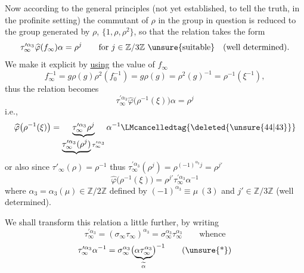 

Now according to the general principles (not yet established, to tell the truth, in the profinite setting) the commutant of $\rho$ in the group in question is reduced to the group generated by $\rho$, $\{1,\rho,\rho^2\}$, so that the relation \unsure{(*)} takes the form
\[
\tau_\infty^{\prime\alpha_3}\widehat{\varphi}(f_\infty)\alpha=\rho^j
\qquad\text{for }j\in\mathbb Z/3\mathbb Z\ \unsure{\text{suitable}}
\quad\text{(well determined)}.
\]
We make it explicit by \uline{using} the value of $f_\infty$
\[
f_\infty^{-1}=g\rho(g)\rho^2(f_0^{-1})
=g\rho(g)=\rho^2(g)^{-1}=\rho^{-1}(\xi^{-1}),
\]
thus the relation  becomes
\[
\tau_\infty^{\prime\alpha_3}\widehat{\varphi}\bigl(\rho^{-1}(\xi)\bigr)\alpha=\rho^j
\]
i.e., 
\[
\widehat{\varphi}\bigl(\rho^{-1}(\xi)\bigr)
=\underbrace{\tau_\infty^{\prime\alpha_3}\rho^j}_{\underbrace{\tau_\infty^{\prime\alpha_3}(\rho^j)}\tau_\infty^{\prime\alpha_3}}\alpha^{-1}
\LMcancelledtag{\deleted{\unsure{44|43}}}
\]
or also
\deleted{\[
\widehat{\varphi}\bigl(\rho^{-1}(\xi^{-1})\bigr)=\alpha\rho^{-j}\tau_\infty^{\prime\alpha_3}.
\tag{\unsure{44 bis|43 bis}}
\]}
since $\tau'_\infty(\rho)=\rho^{-1}$ thus
$\tau_\infty^{\prime\alpha_3}(\rho^j)=\rho^{(-1)^{\alpha_3}j}=\rho^{j'}$
\[
\widehat{\varphi}\bigl(\rho^{-1}(\xi)\bigr)=\rho^{j'}\tau_\infty^{\prime\alpha_3}\alpha^{-1}
\tag{44}
\]
where $\alpha_3=\alpha_3(\mu)\in\mathbb Z/2\mathbb Z$ defined by $(-1)^{\alpha_3}\equiv\mu\ (3)$ and $j'\in\mathbb Z/3\mathbb Z$ (well determined).

We shall transform this relation a little further, by writing
\[
\tau_\infty^{\prime\alpha_3}=(\sigma_\infty\tau_\infty)^{\alpha_3}=\sigma_\infty^{\alpha_3}\tau_\infty^{\alpha_3}
\qquad\text{whence}
\]
\[
\tau_\infty^{\prime\alpha_3}\alpha^{-1}=\sigma_\infty^{\alpha_3}\bigl(\underbrace{\alpha\tau_\infty^{\alpha_3}}_{\widetilde\alpha}\bigr)^{-1}
\tag{\unsure{*}}
\]


